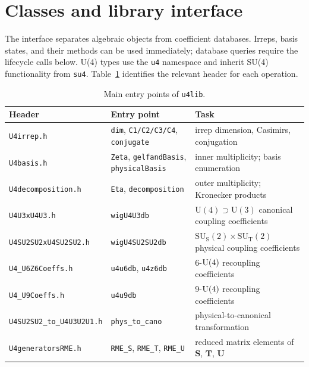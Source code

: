\documentclass[aps,onecolumn,10pt,superscriptaddress,floatfix,nofootinbib]{revtex4}
\begin{document}
\section{Classes and library interface}
\label{sec:classes}

The interface separates algebraic objects from coefficient databases.
Irreps, basis states, and their methods can be used immediately; database
queries require the lifecycle calls below. U(4) types use the \verb|u4|
namespace and inherit SU(4) functionality from \verb|su4|.
Table~\ref{tab:main-funcs} identifies the relevant header for each operation.

\begin{table}[h!]
    \centering
    \begin{tabular}{p{4.3cm}p{5.9cm}p{6.5cm}}
    \hline\hline
         Header & Entry point & Task \\
        \hline
         \verb|U4irrep.h| & \verb|dim|, \verb|C1/C2/C3/C4|, \verb|conjugate| & irrep dimension, Casimirs, conjugation \\
         \verb|U4basis.h| & \verb|Zeta|, \verb|gelfandBasis|, \verb|physicalBasis| & inner multiplicity; basis enumeration \\
         \verb|U4decomposition.h| & \verb|Eta|, \verb|decomposition| & outer multiplicity; Kronecker products \\
         \verb|U4U3xU4U3.h| & \verb|wigU4U3db| & $\mathrm{U(4)}{\supset}\mathrm{U(3)}$ canonical coupling coefficients \\
         \verb|U4SU2SU2xU4SU2SU2.h| & \verb|wigU4SU2SU2db| & $\mathrm{SU_S(2)}{\times}\mathrm{SU_T(2)}$ physical coupling coefficients \\
         \verb|U4_U6Z6Coeffs.h| & \verb|u4u6db|, \verb|u4z6db| & 6-$\rm U(4)$ recoupling coefficients \\
         \verb|U4_U9Coeffs.h| & \verb|u4u9db| & 9-$\rm U(4)$ recoupling coefficients \\
         \verb|U4SU2SU2_to_U4U3U2U1.h| & \verb|phys_to_cano| & physical-to-canonical transformation \\
         \verb|U4generatorsRME.h| & \verb|RME_S|, \verb|RME_T|, \verb|RME_U| & reduced matrix elements of $\mathbf{S}$, $\mathbf{T}$, $\mathbf{U}$ \\
    \hline\hline
    \end{tabular}
    \caption{Main entry points of \texttt{u4lib}.}
    \label{tab:main-funcs}
\end{table}
\end{document}
